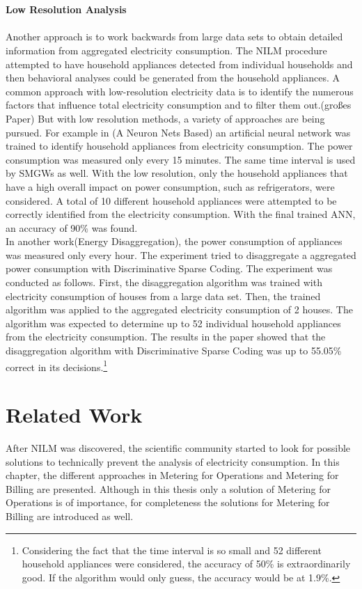 \\
\\
\textbf{Low Resolution Analysis}
\\
\\Another approach is to work backwards from large data sets to obtain detailed information from aggregated electricity consumption. The NILM procedure attempted to have household appliances detected from individual households and then behavioral analyses could be generated from the household appliances. A common approach with low-resolution electricity data is to identify the numerous factors that influence total electricity consumption and to filter them out.(großes Paper) 
But with low resolution methods, a variety of approaches are being pursued.
For example in (A Neuron Nets Based) an artificial neural network was trained to identify household appliances from electricity consumption. The power consumption was measured only every 15 minutes. The same time interval is used by SMGWs as well. With the low resolution, only the household appliances that have a high overall impact on power consumption, such as refrigerators, were considered. A total of 10 different household appliances were attempted to be correctly identified from the electricity consumption. With the final trained ANN, an accuracy of 90\% was found.
\\%
In another work(Energy Disaggregation), the power consumption of appliances was measured only every hour. The experiment tried to disaggregate a aggregated power consumption with Discriminative Sparse Coding. The experiment was conducted as follows. First, the disaggregation algorithm was trained with electricity consumption of houses from a large data set. Then, the trained algorithm was applied to the aggregated electricity consumption of 2 houses. The algorithm was expected to determine up to 52 individual household appliances from the electricity consumption. The results in the paper showed that the disaggregation algorithm with Discriminative Sparse Coding was up to 55.05\% correct in its decisions.\footnote[1]{Considering the fact that the time interval is so small and 52 different household appliances were considered, the accuracy of 50\% is extraordinarily good. If the algorithm would only guess, the accuracy would be at 1.9\%.}

\section{Related Work}
After NILM was discovered, the scientific community started to look for possible solutions to technically prevent the analysis of electricity consumption. In this chapter, the different approaches in Metering for Operations and Metering for Billing are presented. Although in this thesis only a solution of Metering for Operations is of importance, for completeness the solutions for Metering for Billing are introduced as well.
